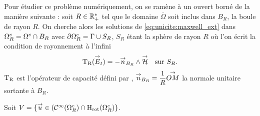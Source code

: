 
  Pour étudier ce problème numériquement, on se ramène à un ouvert borné de la manière suivante : soit \(R\in\mathbb R_+^*\) tel que le domaine \(\overline{\Omega}\) soit inclus dans \(B_R\), la boule de rayon \(R\).
  On cherche alors les solutions de \eqref{eq:unicite:maxwell_ext} dans \(\Omega^c_R=\Omega^c\cap B_R\) avec \(\partial\Omega^c_R = \Gamma\cup S_R\), \(S_R\) étant la sphère de rayon \(R\) où l'on écrit la condition de rayonnement à l'infini
  \begin{equation}
    \label{eq:unicite:TR}
    \begin{aligned}
    \operatorname{T_R}({\overset{\rightarrow}{E}}_t) = - {\overset{\rightarrow}{n}}_{B_R} \wedge {\overset{\rightarrow}{\mathcal{H}}} && \text{sur \(S_R\).}
    \end{aligned}
  \end{equation}
  \(\operatorname{T_R}\) est l'opérateur de capacité défini par \cite[p.~200]{nedelec_acoustic_2001}, \({\overset{\rightarrow}{n}}_{B_R}=\dfrac{1}{R}{\overset{\rightarrow}{OM}}\) la normale unitaire sortante à \(B_R\).

  Soit \(V = \lbrace {\overset{\rightarrow}{u}} \in (\mathcal{C}^\infty(\Omega^c_R)\cap\mathrm{H}_\mathrm{rot}(\Omega^c_R) \rbrace\).

